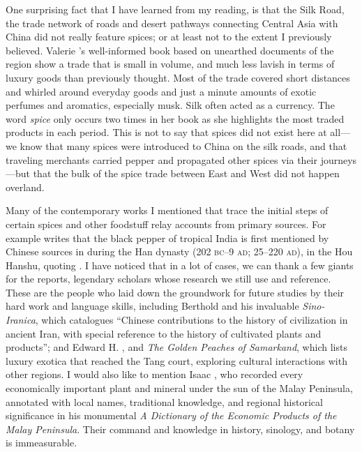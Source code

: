 One surprising fact that I have learned from my reading, is that the Silk Road, the trade network of roads and desert pathways connecting Central Asia with China did not really feature spices; or at least not to the extent I previously believed. Valerie \textcite{hansen_silk_2012}'s well-informed book based on unearthed documents of the region show a trade that is small in volume, and much less lavish in terms of luxury goods than previously thought. Most of the trade covered short distances and whirled around everyday goods and just a minute amounts of exotic perfumes and aromatics, especially musk. Silk often acted as a currency. The word \textit{spice} only occurs two times in her book as she highlights the most traded products in each period. This is not to say that spices did not exist here at all---we know that many spices were introduced to China on the silk roads, and that traveling merchants carried pepper and propagated other spices via their journeys---but that the bulk of the spice trade between East and West did not happen overland.


Many of the contemporary works I mentioned that trace the initial steps of certain spices and other foodstuff relay accounts from primary sources. For example \textcite{spengler_spices_2019} writes that the black pepper of tropical India is first mentioned by Chinese sources in during the Han dynasty (202 \textsc{bc}--9 \textsc{ad}; 25--220 \textsc{ad}), in the \gls{Hou Hanshu}, quoting \textcite[374]{laufer_sino-iranica_1919}. I have noticed that in a lot of cases, we can thank a few giants for the reports, legendary scholars whose research we still use and reference. These are the people who laid down the groundwork for future studies by their hard work and language skills, including Berthold \textcite{laufer_sino-iranica_1919} and his invaluable \textit{Sino-Iranica}, which catalogues ``Chinese contributions to the history of civilization in ancient Iran, with special reference to the history of cultivated plants and products''; and Edward H. \textcite{schafer_golden_1985}, and \textit{The Golden Peaches of Samarkand}, which lists luxury exotica that reached the Tang court, exploring cultural interactions with other regions. I would also like to mention Isaac \textcite{burkill_dictionary_1935}, who recorded every economically important plant and mineral under the sun of the Malay Peninsula, annotated with local names, traditional knowledge, and regional historical significance in his monumental \textit{A Dictionary of the Economic Products of the Malay Peninsula}. Their command and knowledge in history, sinology, and botany is immeasurable.

